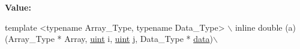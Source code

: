 {\bfseries Value\+:}
\begin{DoxyCode}
\textcolor{keyword}{template} <\textcolor{keyword}{typename} Array\_Type, \textcolor{keyword}{typename} Data\_Type> \(\backslash\)
  inline double (a) (Array\_Type * Array, \hyperlink{typedefs_8hpp_a91ad9478d81a7aaf2593e8d9c3d06a14}{uint} i, \hyperlink{typedefs_8hpp_a91ad9478d81a7aaf2593e8d9c3d06a14}{uint} j, Data\_Type * 
      \hyperlink{class_counter_a9ebfed99a67888f80c19cabc4098bdd0}{data})\(\backslash\)
\end{DoxyCode}
